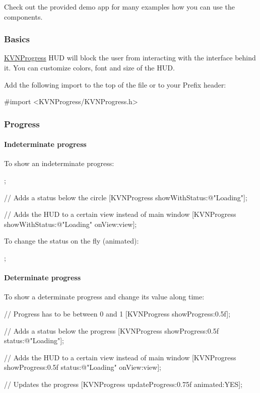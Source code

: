 Check out the provided demo app for many examples how you can use the components.

\subsubsection*{Basics}

\mbox{\hyperlink{interface_k_v_n_progress}{K\+V\+N\+Progress}} H\+UD will block the user from interacting with the interface behind it. You can customize colors, font and size of the H\+UD.

Add the following import to the top of the file or to your Prefix header\+:


\begin{DoxyCode}
#import <KVNProgress/KVNProgress.h>
\end{DoxyCode}


\subsubsection*{Progress}

\paragraph*{Indeterminate progress}

To show an indeterminate progress\+:


\begin{DoxyCode}
;

// Adds a status below the circle
[KVNProgress showWithStatus:@"Loading"];

// Adds the HUD to a certain view instead of main window
[KVNProgress showWithStatus:@"Loading"
                     onView:view];
\end{DoxyCode}


To change the status on the fly (animated)\+:


\begin{DoxyCode}
;
\end{DoxyCode}


\paragraph*{Determinate progress}

To show a determinate progress and change its value along time\+:


\begin{DoxyCode}
// Progress has to be between 0 and 1
[KVNProgress showProgress:0.5f];

// Adds a status below the progress
[KVNProgress showProgress:0.5f
                   status:@"Loading"];

// Adds the HUD to a certain view instead of main window
[KVNProgress showProgress:0.5f
                   status:@"Loading"
                   onView:view];

// Updates the progress
[KVNProgress updateProgress:0.75f
                   animated:YES];
\end{DoxyCode}


